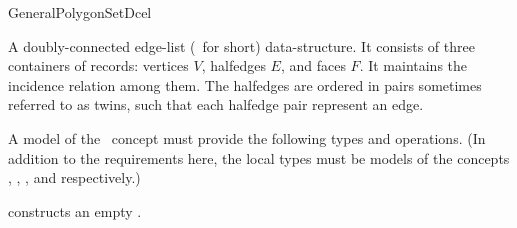 \ccRefPageBegin

\begin{ccRefConcept}{GeneralPolygonSetDcel}

A doubly-connected edge-list (\dcel\ for short) data-structure. It consists
of three containers of records: vertices $V$, halfedges $E$, and faces $F$.
It maintains the incidence relation among them. The halfedges are ordered
in pairs sometimes referred to as twins, such that each halfedge pair
represent an edge.

A model of the \ccRefName\ concept must provide the following types and 
operations. (In addition to the requirements here, the local types 
must be models of the concepts 
,
,
,
 and
 respectively.)


\ccCreation
{}
   {constructs an empty \dcel.}



\ccHasModels

\ccSeeAlso

\end{ccRefConcept}

\ccRefPageEnd

